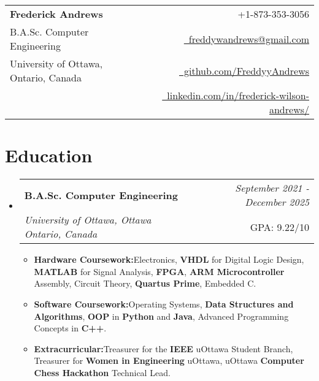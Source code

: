 \documentclass[a4paper,11pt]{article}
\makeatletter
\newcommand{\resumeItem}[2]{\item{\textbf{#1}{\hspace{0.5mm}#2 \vspace{-0.5mm}}}}
\newcommand{\resumeSubheading}[4]{\vspace{0.5mm}\item\begin{tabular*}{0.98\textwidth}[t]{l@{\extracolsep{\fill}}r}\textbf{#1} & \textit{\footnotesize{#4}} \\\textit{\footnotesize{#3}} &  \footnotesize{#2}\\\end{tabular*}\vspace{-2.4mm}}
\newcommand{\resumeSubHeadingListStart}{\begin{itemize}[leftmargin=*,labelsep=0mm]}
\newcommand{\resumeItemListStart}{\begin{justify}\begin{itemize}[label=\textcolor{black}{--}, leftmargin=3ex, rightmargin=2ex, noitemsep,labelsep=1.2mm,itemsep=0mm]\small}
\newcommand{\resumeSubHeadingListEnd}{\end{itemize}\vspace{2mm}}
\newcommand{\resumeItemListEnd}{\end{itemize}\end{justify}\vspace{-2mm}}
\newcommand{\name}{Frederick Andrews}
\newcommand{\phone}{873-353-3056}
\newcommand{\emaila}{freddywandrews@gmail.com}
\makeatother
\begin{document}
\selectfont
{}
\setlength{\footskip}{8pt}

{\begin{tabularx}{\linewidth}{L r} \\
  \textbf{\Large \name} & {\raisebox{0.0\height}{\footnotesize \faPhone}\ +1-\phone}\\
  B.A.Sc. Computer Engineering & \href{mailto:\emaila}{\raisebox{0.0\height}{\footnotesize \faEnvelope}\ \emaila} \\
  University of Ottawa, Ontario, Canada & \href{https://github.com/FreddyyAndrews}{\raisebox{0.0\height}{\footnotesize \faGithub}\ github.com/FreddyyAndrews} \\
  & \href{https://www.linkedin.com/in/frederick-wilson-andrews/}{\raisebox{0.0\height}{\footnotesize \faLinkedin}\ linkedin.com/in/frederick-wilson-andrews/}
\end{tabularx}}
\vspace{-6mm}

\section{\textbf{Education}}
  \resumeSubHeadingListStart
    \resumeSubheading{B.A.Sc. Computer Engineering}{GPA: 9.22/10}{University of Ottawa, Ottawa Ontario, Canada}{September 2021 - December 2025}
      \resumeItemListStart
        \resumeItem{Hardware Coursework:}{Electronics, \textbf{VHDL} for Digital Logic Design, \textbf{MATLAB} for Signal Analysis, \textbf{FPGA}, \textbf{ARM Microcontroller} Assembly, Circuit Theory, \textbf{Quartus Prime}, Embedded C.}
        \vspace{1mm}
        \resumeItem{Software Coursework:}{Operating Systems, \textbf{Data Structures and Algorithms}, \textbf{OOP} in \textbf{Python} and \textbf{Java}, Advanced Programming Concepts in \textbf{C++}.}
        \vspace{1mm}
        \resumeItem{Extracurricular:}{Treasurer for the \textbf{IEEE} uOttawa Student Branch, Treasurer for \textbf{Women in Engineering} uOttawa, uOttawa \textbf{Computer Chess Hackathon} Technical Lead.}
      \resumeItemListEnd
  \resumeSubHeadingListEnd
\vspace{-6mm}

\end{document}
